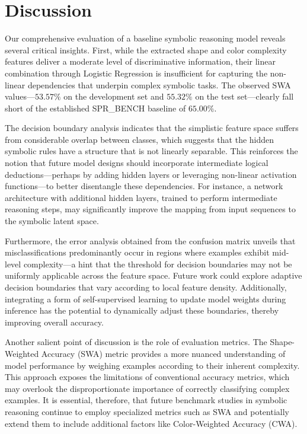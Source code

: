 \documentclass{article}
\begin{document}
\section{Discussion}
Our comprehensive evaluation of a baseline symbolic reasoning model reveals several critical insights. First, while the extracted shape and color complexity features deliver a moderate level of discriminative information, their linear combination through Logistic Regression is insufficient for capturing the non-linear dependencies that underpin complex symbolic tasks. The observed SWA values—\(53.57\%\) on the development set and \(55.32\%\) on the test set—clearly fall short of the established SPR\_BENCH baseline of \(65.00\%\).

The decision boundary analysis indicates that the simplistic feature space suffers from considerable overlap between classes, which suggests that the hidden symbolic rules have a structure that is not linearly separable. This reinforces the notion that future model designs should incorporate intermediate logical deductions—perhaps by adding hidden layers or leveraging non-linear activation functions—to better disentangle these dependencies. For instance, a network architecture with additional hidden layers, trained to perform intermediate reasoning steps, may significantly improve the mapping from input sequences to the symbolic latent space.

Furthermore, the error analysis obtained from the confusion matrix unveils that misclassifications predominantly occur in regions where examples exhibit mid-level complexity—a hint that the threshold for decision boundaries may not be uniformly applicable across the feature space. Future work could explore adaptive decision boundaries that vary according to local feature density. Additionally, integrating a form of self-supervised learning to update model weights during inference has the potential to dynamically adjust these boundaries, thereby improving overall accuracy.

Another salient point of discussion is the role of evaluation metrics. The Shape-Weighted Accuracy (SWA) metric provides a more nuanced understanding of model performance by weighing examples according to their inherent complexity. This approach exposes the limitations of conventional accuracy metrics, which may overlook the disproportionate importance of correctly classifying complex examples. It is essential, therefore, that future benchmark studies in symbolic reasoning continue to employ specialized metrics such as SWA and potentially extend them to include additional factors like Color-Weighted Accuracy (CWA).
\end{document}
